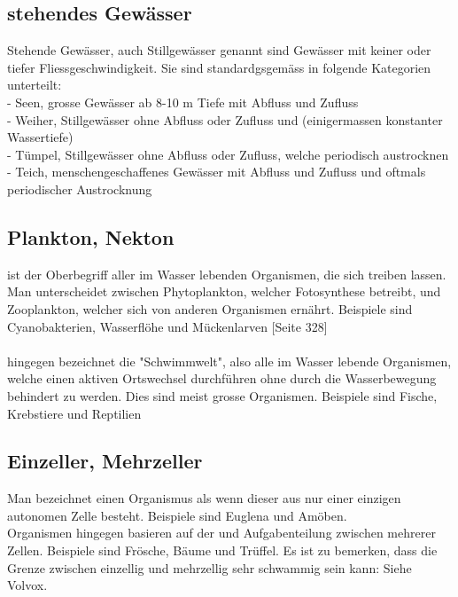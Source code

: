 \documentclass{article}
\begin{document}
    \subsection{stehendes Gewässer}
    
        Stehende Gewässer, auch Stillgewässer genannt sind Gewässer mit keiner oder tiefer Fliessgeschwindigkeit. Sie sind standardgsgemäss in folgende Kategorien unterteilt: \\
        
        - Seen, grosse Gewässer ab 8-10 m Tiefe mit Abfluss und Zufluss \\
        - Weiher, Stillgewässer ohne Abfluss oder Zufluss und (einigermassen konstanter Wassertiefe) \\
        - Tümpel, Stillgewässer ohne Abfluss oder Zufluss, welche periodisch austrocknen \\
        - Teich, menschengeschaffenes Gewässer mit Abfluss und Zufluss und oftmals periodischer Austrocknung \\ \cite{Kleingewasserkunde}
    
    \subsection{Plankton, Nekton}
    
         ist der Oberbegriff aller im Wasser lebenden Organismen, die sich treiben lassen. Man unterscheidet zwischen Phytoplankton, welcher Fotosynthese betreibt, und Zooplankton, welcher sich von anderen Organismen ernährt. Beispiele sind Cyanobakterien, Wasserflöhe und Mückenlarven \cite{Biobuch} [Seite 328] \\ \\
        
         hingegen bezeichnet die "Schwimmwelt", also alle im Wasser lebende Organismen, welche einen aktiven Ortswechsel durchführen ohne durch die Wasserbewegung behindert zu werden. Dies sind meist grosse Organismen. Beispiele sind Fische, Krebstiere und Reptilien \cite{Spektrum}
    
    \subsection{Einzeller, Mehrzeller}
    
        Man bezeichnet einen Organismus als  wenn dieser aus nur einer einzigen autonomen Zelle besteht. Beispiele sind Euglena und Amöben. \\  Organismen hingegen basieren auf der und Aufgabenteilung zwischen mehrerer Zellen. Beispiele sind Frösche, Bäume und Trüffel.
        Es ist zu bemerken, dass die Grenze zwischen einzellig und mehrzellig sehr schwammig sein kann: Siehe Volvox.
    
\end{document}
